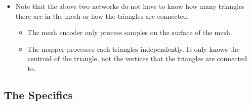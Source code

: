 \documentclass[10pt]{article}
\begin{document}
\begin{itemize}
    \item Note that the above two networks do not have to know how many triangles there are in the mesh or how the triangles are connected.
    \begin{itemize}
        \item The mesh encoder only process samples on the surface of the mesh.
        \item The mapper processes each triangles independently. It only knows the centroid of the triangle, not the vertices that the triangles are connected to.
    \end{itemize}
\end{itemize}

\subsection{The Specifics}
\end{document}

